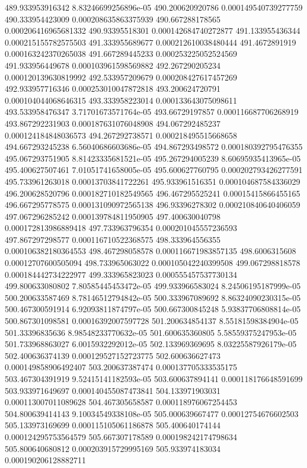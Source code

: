 {489.933953916342 8.83246699256896e-05
490.200620920786 0.000149540739277759
490.333954423009 0.000208635863375939
490.667288178565 0.000206416965681332
490.93395518301 0.000142684740272877
491.133955436344 0.000215155782575503
491.333955689677 0.000212610038480444
491.4672891919 0.000163242370265038
491.667289445233 0.000253225052524569
491.933956449678 0.000103961598569882
492.267290205234 0.000120139630819992
492.533957209679 0.000208427617457269
492.933957716346 0.000253010047872818
493.200624720791 0.000104044068646315
493.333958223014 0.000133643075098611
493.533958476347 3.71701673571764e-05
493.66729197857 0.000116687706268919
493.867292231903 0.000187631076048908
494.067292485237 0.000124184848036573
494.267292738571 0.000218495515668658
494.667293245238 6.56040686603686e-05
494.867293498572 0.000180392795476355
495.067293751905 8.81423335681521e-05
495.267294005239 8.60695935413965e-05
495.400627507461 7.01051741658005e-05
495.600627760795 0.000202793426277591
495.733961263018 0.00013703841722261
495.933961516351 0.000104687584336029
496.200628520796 0.000182710182549565
496.467295525241 0.00015415866455165
496.667295778575 0.000131090972565138
496.93396278302 0.000210840640406059
497.067296285242 0.000139784811950905
497.400630040798 0.000172813986889418
497.733963796354 0.000201045557236593
497.867297298577 0.000116710522368575
498.333964556355 0.000106382180364553
498.467298058578 0.000116671983857135
498.6006315608 0.00012707600505094
498.733965063022 0.000105042240399508
499.067298818578 0.000184442734222977
499.333965823023 0.000555457537730134
499.800633080802 7.80585445453472e-05
499.933966583024 8.24506195187999e-05
500.200633587469 8.78146512794842e-05
500.333967089692 8.86324090230315e-05
500.467300591914 6.92093811874797e-05
500.667300845248 5.93837706808814e-05
500.867301098581 0.00016392007597728
501.200634854137 8.55181598384904e-05
501.33396835636 8.98548233770632e-05
501.600635360805 5.58559375247953e-05
501.733968863027 6.0015932292012e-05
502.133969369695 8.03225587926179e-05
502.400636374139 0.000129527152723775
502.600636627473 0.000149858906492407
503.200637387474 0.000137705333535175
503.467304391919 9.52415141182593e-05
503.600637894141 0.000118176648591699
503.933971649697 0.000140455087473841
504.133971903031 0.000113007011089628
504.467305658587 0.000118976067254453
504.800639414143 9.10034549338108e-05
505.000639667477 0.00012754676602503
505.133973169699 0.000115105061186878
505.400640174144 0.000124295753564579
505.667307178589 0.000198242174798634
505.800640680812 0.000203915729995169
505.933974183034 0.000190206128882711
}
